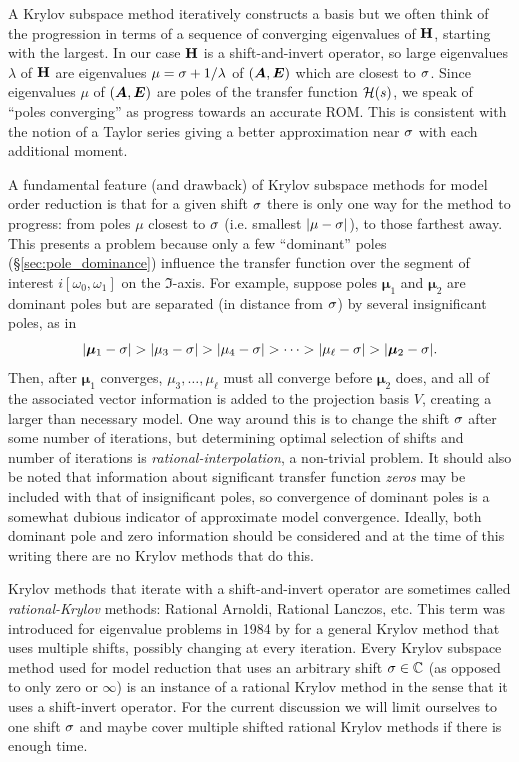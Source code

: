 A Krylov subspace method iteratively constructs a basis but we often think of the progression in terms of a sequence of converging eigenvalues of $\textbf{\textup{H}}$, starting with the largest.   In our case $\textbf{\textup{H}}$ is a shift-and-invert operator, so large eigenvalues $\lambda$ of $\textbf{\textup{H}}$ are eigenvalues $\mu=\sigma + 1/\lambda$ of $(\bm{A},\bm{E})$ which are closest to $\sigma$.   Since eigenvalues $\mu$ of $(\bm{A},\bm{E})$ are poles of the transfer function $\mathcal{H}(s)$, we speak of ``poles converging''  as progress towards an accurate ROM.   This is consistent with the notion of a Taylor series giving a better approximation near $\sigma$ with each additional moment. 

  A fundamental feature (and drawback) of Krylov subspace methods for model order reduction is that for a given shift $\sigma$ there is only one way for the method to progress: from poles $\mu$ closest to $\sigma$ (i.e. smallest $|\mu - \sigma|$), to those farthest away.   This presents a problem because only a few ``dominant'' poles (\S\ref{sec:pole_dominance}) influence the transfer function over the segment of interest $i [\omega_0,\omega_1]$ on the $\Im$-axis.  For example, suppose poles $\bm{\mu}_1$ and $\bm{\mu}_2$ are dominant poles but are separated (in distance from $\sigma$) by several insignificant poles,  as in 
\[
| \bm{\mu}_1  -\sigma| >| \mu_3 - \sigma| > |\mu_4-\sigma| > \cdots > |\mu_\ell-\sigma| >
|\bm{\mu}_2-\sigma|. 
\]
 Then, after $\bm{\mu}_1$ converges,  $\mu_3,\ldots,\mu_\ell$  must all converge before $\bm{\mu}_2$ does, and all of the associated vector information is added to the projection basis $V$, creating a larger than necessary model.      One way around this is to change the shift $\sigma$ after some number of iterations, but determining optimal selection of shifts and number of iterations is \emph{rational-interpolation}, a non-trivial problem.    It should also be noted that information about significant transfer function \emph{zeros} may be included with that of insignificant poles, so convergence of dominant poles is a somewhat dubious indicator of approximate model convergence.  Ideally, both dominant pole and zero information should be considered and at the time of this writing there are no Krylov methods that do this.
 
Krylov methods that iterate with a shift-and-invert operator are sometimes called \emph{rational-Krylov} methods: Rational Arnoldi, Rational Lanczos, etc.   This term was introduced for eigenvalue problems in 1984 by \cite{ruhe1984} for a general Krylov method that uses multiple shifts, possibly changing at every iteration.  Every Krylov subspace method used for model reduction that uses an arbitrary shift $\sigma\in\mathbb{C}$ (as opposed to only zero or $\infty$) is an instance of a rational Krylov method in the sense that it uses a shift-invert operator.  For the current discussion we will limit ourselves to one shift $\sigma$ and maybe cover multiple shifted rational Krylov methods if there is enough time.


